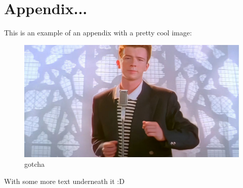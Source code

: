 \chapter{Appendix...}

This is an example of an appendix with a pretty cool image:

\begin{figure}[ht]
	\centering
	\includegraphics[width=\textwidth]{assets/example-asset.jpg}
	\caption{gotcha}
	\label{fig:rick_roll}
\end{figure}

With some more text underneath it :D